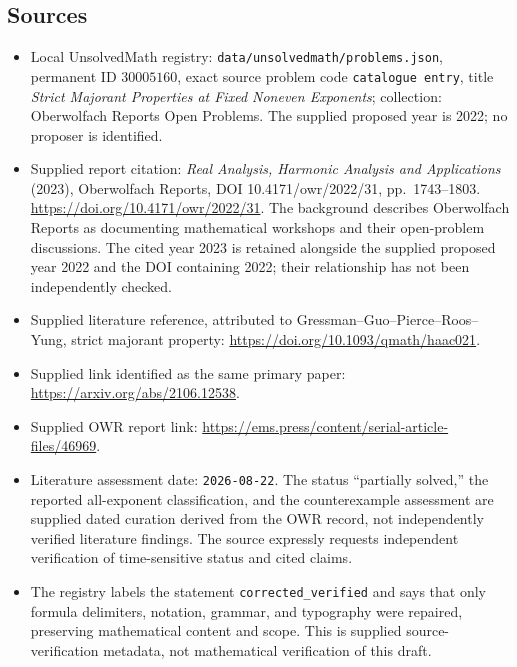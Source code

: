 \documentclass[11pt]{article}
\begin{document}
\subsection{Sources}
\begin{itemize}
\item Local UnsolvedMath registry: \texttt{data/unsolvedmath/problems.json}, permanent ID \(30005160\), exact source problem code \texttt{catalogue entry}, title \emph{Strict Majorant Properties at Fixed Noneven Exponents}; collection: Oberwolfach Reports Open Problems. The supplied proposed year is 2022; no proposer is identified.
\item Supplied report citation: \emph{Real Analysis, Harmonic Analysis and Applications} (2023), Oberwolfach Reports, DOI 10.4171/owr/2022/31, pp.\ 1743--1803. \url{https://doi.org/10.4171/owr/2022/31}. The background describes Oberwolfach Reports as documenting mathematical workshops and their open-problem discussions. The cited year 2023 is retained alongside the supplied proposed year 2022 and the DOI containing 2022; their relationship has not been independently checked.
\item Supplied literature reference, attributed to Gressman--Guo--Pierce--Roos--Yung, strict majorant property: \url{https://doi.org/10.1093/qmath/haac021}.
\item Supplied link identified as the same primary paper: \url{https://arxiv.org/abs/2106.12538}.
\item Supplied OWR report link: \url{https://ems.press/content/serial-article-files/46969}.
\item Literature assessment date: \texttt{2026-08-22}. The status ``partially solved,'' the reported all-exponent classification, and the counterexample assessment are supplied dated curation derived from the OWR record, not independently verified literature findings. The source expressly requests independent verification of time-sensitive status and cited claims.
\item The registry labels the statement \texttt{corrected\_verified} and says that only formula delimiters, notation, grammar, and typography were repaired, preserving mathematical content and scope. This is supplied source-verification metadata, not mathematical verification of this draft.
\end{itemize}
\end{document}
